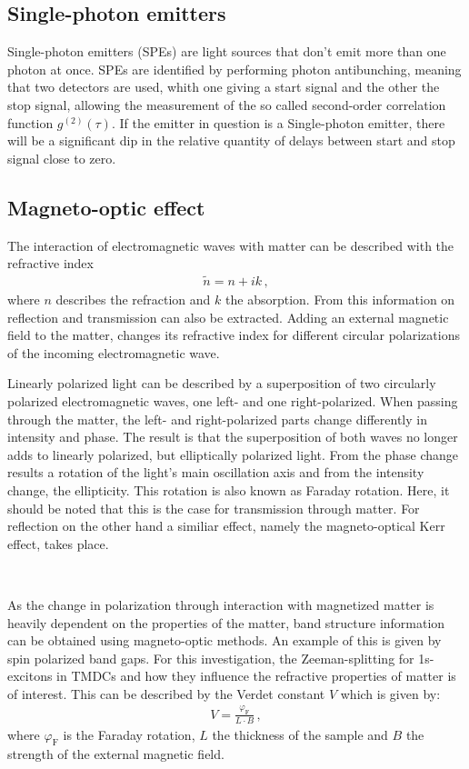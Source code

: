 \subsection{Single-photon emitters}
\label{sec:theory:spe}

Single-photon emitters (SPEs) are light sources that don't emit more than one photon at once.
SPEs are identified by performing photon antibunching, meaning that two detectors are used, whith one giving a start signal and the other the stop signal, allowing the measurement of the so called second-order correlation function $g^{(2)}(\tau)$.
If the emitter in question is a Single-photon emitter, there will be a significant dip in the relative quantity of delays between start and stop signal close to zero.

\subsection{Magneto-optic effect}

	The interaction of electromagnetic waves with matter can be described with the refractive index
	\begin{align*}
		\tilde{n} = n + ik \,,
	\end{align*}
	where $n$ describes the refraction and $k$ the absorption.
	From this information on reflection and transmission can also be extracted.
	Adding an external magnetic field to the matter, changes its refractive index for different circular polarizations of the incoming electromagnetic wave.

  Linearly polarized light can be described by a superposition of two circularly polarized electromagnetic waves, one left- and one right-polarized.
	When passing through the matter, the left- and right-polarized parts change differently in intensity and phase.
	The result is that the superposition of both waves no longer adds to linearly polarized, but elliptically polarized light.
	From the phase change results a rotation of the light's main oscillation axis and from the intensity change, the ellipticity.
	This rotation is also known as Faraday rotation.
	Here, it should be noted that this is the case for transmission through matter.
  For reflection on the other hand a similiar effect, namely the magneto-optical Kerr effect, takes place.

	\

	As the change in polarization through interaction with magnetized matter is heavily dependent on the properties of the matter, band structure information can be obtained using magneto-optic methods.
	An example of this is given by spin polarized band gaps.
	For this investigation, the Zeeman-splitting for 1s-excitons in TMDCs and how they influence the refractive properties of matter is of interest.
	This can be described by the Verdet constant $V$ which is given by:
	\begin{align*}
		V = \frac{\varphi_\text{F}}{L\cdot B} \,,
	\end{align*}
	where $\varphi_\text{F}$ is the Faraday rotation, $L$ the thickness of the sample and $B$ the strength of the external magnetic field.

